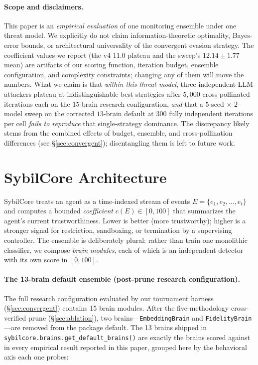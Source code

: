 \documentclass{article}
\begin{document}
\paragraph{Scope and disclaimers.}
This paper is an \emph{empirical evaluation} of one monitoring ensemble
under one threat model. We explicitly do not claim information-theoretic
optimality, Bayes-error bounds, or architectural universality of the
convergent evasion strategy. The coefficient values we report (the v4
$11.0$ plateau and the sweep's $12.14 \pm 1.77$ mean) are artifacts of
our scoring function, iteration budget, ensemble configuration, and
complexity constraints; changing any of them will move the numbers.
What we claim is that \emph{within this threat model}, three
independent LLM attackers plateau at indistinguishable best strategies
after $5{,}000$ cross-pollinated iterations each on the $15$-brain
research configuration, \emph{and} that a $5$-seed $\times$ $2$-model
sweep on the corrected $13$-brain default at $300$ fully independent
iterations per cell \emph{fails to reproduce} that single-strategy
dominance. The discrepancy likely stems from the combined effects of
budget, ensemble, and cross-pollination differences (see
\S\ref{sec:convergent}); disentangling them is left to future work.

\section{SybilCore Architecture}
\label{sec:arch}

SybilCore treats an agent as a time-indexed stream of events
$E = \{e_1, e_2, \ldots, e_t\}$ and computes a bounded
\emph{coefficient} $c(E) \in [0, 100]$ that summarizes the agent's
current trustworthiness. Lower is better (more trustworthy); higher is
a stronger signal for restriction, sandboxing, or termination by a
supervising controller. The ensemble is deliberately plural: rather
than train one monolithic classifier, we compose \emph{brain modules},
each of which is an independent detector with its own score in
$[0, 100]$.

\paragraph{The 13-brain default ensemble (post-prune research configuration).}
The full research configuration evaluated by our tournament harness
(\S\ref{sec:convergent}) contains 15 brain modules. After the
five-methodology cross-verified prune (\S\ref{sec:ablation}), two
brains---\texttt{EmbeddingBrain} and \texttt{FidelityBrain}---are
removed from the package default. The 13 brains shipped in
\texttt{sybilcore.brains.get\_default\_brains()} are exactly the
brains scored against in every empirical result reported in this
paper, grouped here by the behavioral axis each one probes:
\end{document}
